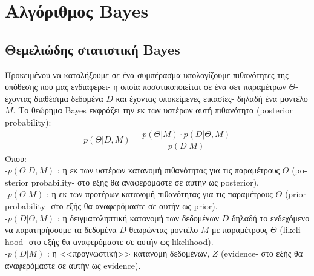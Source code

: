 \chapter{Αλγόριθμος \textlatin{Bayes} } \label{experimentationANDresults}

\section{Θεμελιώδης στατιστική \textlatin{Bayes}} 
Προκειμένου να καταλήξουμε σε ένα συμπέρασμα υπολογίζουμε πιθανότητες της υπόθεσης που μας ενδιαφέρει- η οποία ποσοτικοποιείται σε ένα σετ παραμέτρων $\Theta$- έχοντας διαθέσιμα δεδομένα $D$ και έχοντας υποκείμενες εικασίες- δηλαδή ένα μοντέλο $Μ$. Το θεώρημα \textlatin{Bayes} εκφράζει την εκ των υστέρων αυτή πιθανότητα (\textlatin{posterior probability})\cite{Loredo}: 
\begin{equation}\begin{aligned} p (\Theta |D,M)= \dfrac{ p (\Theta |M) \cdot p (D |\Theta ,M) }{ p (D|M)}  \label{eq:BayesTheorem}\end{aligned}\end{equation}
Όπου:\\
-$p (\Theta |D,M)$ : η εκ των υστέρων κατανομή πιθανότητας για τις παραμέτρους $\Theta$ (\textlatin{posterior probability}- στο εξής θα αναφερόμαστε σε αυτήν ως \textlatin{posterior}).\\
-$p (\Theta |M)$ : η εκ των προτέρων κατανομή πιθανότητας για τις παραμέτρους $\Theta$ (\textlatin{prior probability}- στο εξής θα αναφερόμαστε σε αυτήν ως \textlatin{prior}).\\
-$p (D |\Theta ,M)$ : η δειγματοληπτική κατανομή των δεδομένων $D$ δηλαδή το ενδεχόμενο να παρατηρήσουμε τα δεδομένα $D$ θεωρώντας μοντέλο $Μ$ με παραμέτρους $\Theta$ (\textlatin{likelihood}- στο εξής θα αναφερόμαστε σε αυτήν ως \textlatin{likelihood}).\\
-$p (D|M)$ : η <<προγνωστική>> κατανομή δεδομένων, $Ζ$ (\textlatin{evidence}- στο εξής θα αναφερόμαστε σε αυτήν ως \textlatin{evidence}).

